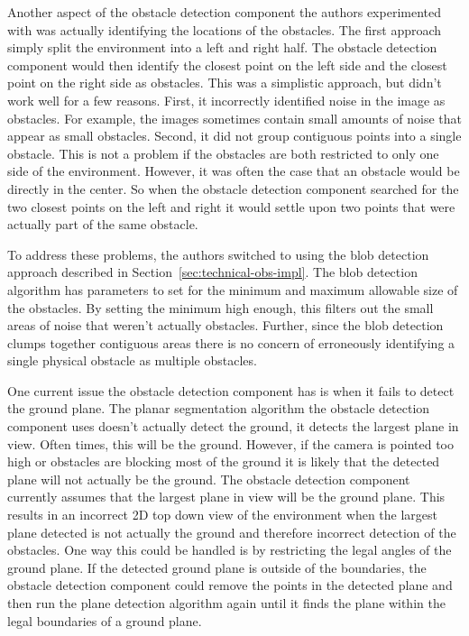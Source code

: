 Another aspect of the obstacle detection component the authors experimented with
was actually identifying the locations of the obstacles. The first approach
simply split the environment into a left and right half. The obstacle detection
component would then identify the closest point on the left side and the
closest point on the right side as obstacles. This was a simplistic approach,
but didn't work well for a few reasons. First, it incorrectly identified noise in
the image as obstacles. For example, the images sometimes contain small amounts of noise
that appear as small obstacles. Second, it did not group contiguous points into
a single obstacle. This is not a problem if the obstacles are both restricted to
only one side of the environment. However, it was often the case that an
obstacle would be directly in the center. So when the obstacle detection component
searched for the two closest points on the left and right it would settle upon
two points that were actually part of the same obstacle.

To address these problems, the authors switched to using the blob detection
approach described in Section~\ref{sec:technical-obs-impl}. The blob detection
algorithm has parameters to set for the minimum and maximum allowable size of
the obstacles. By setting the minimum high enough, this filters out the
small areas of noise that weren't actually obstacles. Further, since the blob
detection clumps together contiguous areas there is no concern of erroneously
identifying a single physical obstacle as multiple obstacles.

One current issue the obstacle detection component has is when it fails to
detect the ground plane. The planar segmentation algorithm the obstacle
detection component uses doesn't actually detect the ground, it detects the
largest plane in view. Often times, this will be the ground. However, if the
camera is pointed too high or obstacles are blocking most of the ground it is
likely that the detected plane will not actually be the ground. The obstacle
detection component currently assumes that the largest plane in view will be the
ground plane. This results in an incorrect 2D top down view of the environment
when the largest plane detected is not actually the ground and therefore
incorrect detection of the obstacles. One way this could be handled is by
restricting the legal angles of the ground plane. If the detected ground plane
is outside of the boundaries, the obstacle detection component could remove the
points in the detected plane and then run the plane detection algorithm again
until it finds the plane within the legal boundaries of a ground plane.

